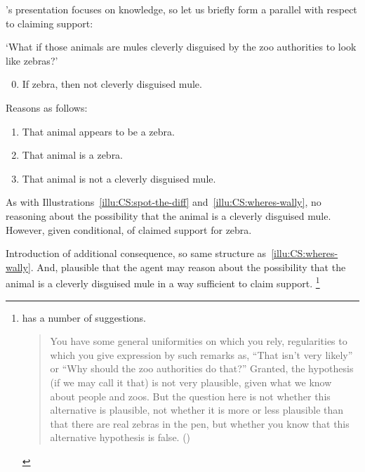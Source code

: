 \begin{note}
  \citeauthor{Dretske:1970to}'s presentation focuses on knowledge, so let us briefly form a parallel with respect to claiming support:

  \begin{illustration}
    \label{illu:dretske-zebra-var}
    \mbox{}
    `What if those animals are mules cleverly disguised by the zoo authorities to look like zebras?'
    \begin{enumerate}[label=\arabic*., ref=(I\ref{illu:CS:wheres-wally}.\arabic*)]
      \setcounter{enumi}{-1}
    \item If zebra, then not cleverly disguised mule.
    \end{enumerate}
    Reasons as follows:
    \begin{enumerate}[label=\arabic*., ref=(I\ref{illu:CS:wheres-wally}.\arabic*)]
    \item That animal appears to be a zebra.
    \item That animal is a zebra.
    \item That animal is not a cleverly disguised mule.
    \end{enumerate}
  \end{illustration}

  As with Illustrations~\ref{illu:CS:spot-the-diff} and~\ref{illu:CS:wheres-wally}, no reasoning about the possibility that the animal is a cleverly disguised mule.
  However, given conditional, \expec{} of claimed support for zebra.

  Introduction of additional consequence, so same structure as~\autoref{illu:CS:wheres-wally}.
  And, plausible that the agent may reason about the possibility that the animal is a cleverly disguised mule in a way sufficient to claim support.\nolinebreak
  \footnote{
    \citeauthor{Dretske:1970to} has a number of suggestions.
    \begin{quote}
    You have some general uniformities on which you rely, regularities to which you give expression by such remarks as, ``That isn't very likely'' or ``Why should the zoo authorities do that?''
    Granted, the hypothesis (if we may call it that) is not very plausible, given what we know about people and zoos.
    But the question here is not whether this alternative is plausible, not whether it is more or less plausible than that there are real zebras in the pen, but whether you know that this alternative hypothesis is false.\nolinebreak
    \mbox{}\hfill\mbox{(\citeyear[1016]{Dretske:1970to})}
  \end{quote}
  }
\end{note}

